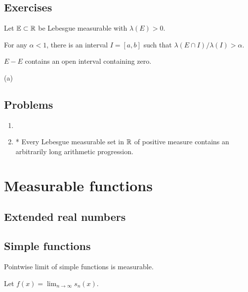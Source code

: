 \documentclass{../note}
\begin{document}
\section*{Exercises}

\begin{prb}
Let $\mathbb{E}\subset\mathbb{R}$ be Lebesgue measurable with $\lambda(E)>0$.
\begin{parts}
\item For any $\alpha<1$, there is an interval $I=[a,b]$ such that $\lambda(E\cap I)/\lambda(I)>\alpha$.
\item $E-E$ contains an open interval containing zero.
\end{parts}
\begin{pf}
(a)
\end{pf}
\end{prb}




\section*{Problems}
\begin{enumerate}
\item 
\item* Every Lebesgue measurable set in $\mathbb{R}$ of positive measure contains an arbitrarily long arithmetic progression.
\end{enumerate}

















\chapter{Measurable functions}

\section{Extended real numbers}


\section{Simple functions}
Pointwise limit of simple functions is measurable.
\begin{pf}
Let $f(x)=\lim_{n\to\infty}s_n(x)$.

\end{pf}
\end{document}
